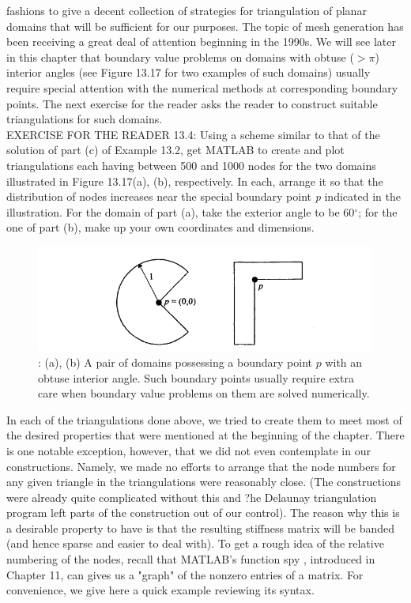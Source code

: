 \documentclass[../main.tex]{subfiles}
\begin{document}
fashions to give a decent collection of strategies for triangulation of planar 
domains that will be sufficient for our purposes. The topic of mesh generation 
has been receiving a great deal of attention beginning in the 1990s. We will see 
later in this chapter that boundary value problems on domains with obtuse ($> \pi$) 
interior angles (see Figure 13.17 for two examples of such domains) usually 
require special attention with the numerical methods at corresponding boundary 
points. The next exercise for the reader asks the reader to construct suitable 
triangulations for such domains.
\\
EXERCISE FOR THE READER 13.4: Using a scheme similar to that of the 
solution of part (c) of Example 13.2, get MATLAB to create and plot 
triangulations each having between 500 and 1000 nodes for the two domains 
illustrated in Figure 13.17(a), (b), respectively. In each, arrange it so that the 
distribution of nodes increases near the special boundary point \textit{p} indicated in the illustration. For the domain of part (a), take the exterior angle to be 60$^\circ$; for the 
one of part (b), make up your own coordinates and dimensions.
\begin{figure}[H]
    \centering
    \includegraphics[width=0.7\linewidth]{2}
    \caption{\textsf{: (a), (b) A pair of domains possessing a boundary point $p$ with an obtuse 
interior angle. Such boundary points usually require extra care when boundary value 
problems on them are solved numerically. }}
    \label{pfig:ch13_1} 
\end{figure} 
In each of the triangulations done above, we tried to create them to meet most of 
the desired properties that were mentioned at the beginning of the chapter. There 
is one notable exception, however, that we did not even contemplate in our 
constructions. Namely, we made no efforts to arrange that the node numbers for 
any given triangle in the triangulations were reasonably close. (The constructions 
were already quite complicated without this and ?he Delaunay triangulation 
program left parts of the construction out of our control). The reason why this is a 
desirable property to have is that the resulting stiffness matrix will be banded (and 
hence sparse and easier to deal with). To get a rough idea of the relative 
numbering of the nodes, recall that MATLAB's function spy , introduced in 
Chapter 11, can gives us a "graph" of the nonzero entries of a matrix. For 
convenience, we give here a quick example reviewing its syntax. 
\end{document}
